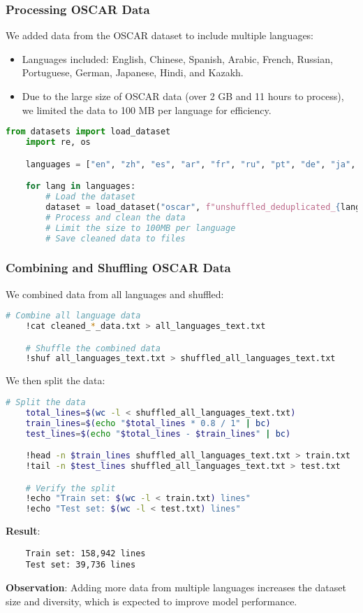 \documentclass{beamer}
\begin{document}
\begin{frame}[fragile]
    \frametitle{Processing OSCAR Data}
    We added data from the OSCAR dataset to include multiple languages:

    \begin{itemize}
        \item Languages included: English, Chinese, Spanish, Arabic, French, Russian, Portuguese, German, Japanese, Hindi, and Kazakh.
        \item Due to the large size of OSCAR data (over 2 GB and 11 hours to process), we limited the data to 100 MB per language for efficiency.
    \end{itemize}

    \begin{lstlisting}[language=python]
    from datasets import load_dataset
    import re, os

    languages = ["en", "zh", "es", "ar", "fr", "ru", "pt", "de", "ja", "hi", "kk"]

    for lang in languages:
        # Load the dataset
        dataset = load_dataset("oscar", f"unshuffled_deduplicated_{lang}", split='train', streaming=True)
        # Process and clean the data
        # Limit the size to 100MB per language
        # Save cleaned data to files
    \end{lstlisting}
\end{frame}

\begin{frame}[fragile]
    \frametitle{Combining and Shuffling OSCAR Data}
    We combined data from all languages and shuffled:

    \begin{lstlisting}[language=bash]
    # Combine all language data
    !cat cleaned_*_data.txt > all_languages_text.txt

    # Shuffle the combined data
    !shuf all_languages_text.txt > shuffled_all_languages_text.txt
    \end{lstlisting}

    We then split the data:

    \begin{lstlisting}[language=bash]
    # Split the data
    total_lines=$(wc -l < shuffled_all_languages_text.txt)
    train_lines=$(echo "$total_lines * 0.8 / 1" | bc)
    test_lines=$(echo "$total_lines - $train_lines" | bc)

    !head -n $train_lines shuffled_all_languages_text.txt > train.txt
    !tail -n $test_lines shuffled_all_languages_text.txt > test.txt

    # Verify the split
    !echo "Train set: $(wc -l < train.txt) lines"
    !echo "Test set: $(wc -l < test.txt) lines"
    \end{lstlisting}

    \textbf{Result}:
    \begin{lstlisting}
    Train set: 158,942 lines
    Test set: 39,736 lines
    \end{lstlisting}

    \textbf{Observation}: Adding more data from multiple languages increases the dataset size and diversity, which is expected to improve model performance.
\end{frame}
\end{document}
